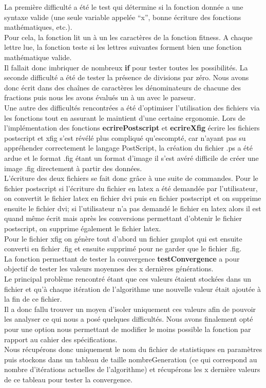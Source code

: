 \documentclass[a4paper,11pt]{article}
\begin{document}
			La première difficulté a été le test qui détermine si la fonction donnée a une syntaxe valide (une seule variable appelée “x”, bonne écriture des fonctions mathématiques, etc.).\\
			Pour cela, la fonction lit  un à un les caractères de la fonction fitness. A chaque lettre lue, la fonction teste si les lettres suivantes forment bien une fonction mathématique valide. \\
			Il fallait donc imbriquer de nombreux \textbf{if} pour tester toutes les possibilités. La seconde difficulté a été de tester la présence de divisions par zéro. Nous avons donc écrit dans des chaînes de caractères les dénominateurs de chacune des fractions puis nous les avons évalués un à un avec le parseur.\\

			Une autre des difficultés rencontrées a été d'optimiser l'utilisation des fichiers via les fonctions tout en assurant le maintient d'une certaine ergonomie.
			Lors de l'implémentation des fonctions \textbf{ecrirePostscript} et  \textbf{ecrireXfig} écrire les fichiers postscript et xfig s’est révélé plus compliqué qu’escompté, car n’ayant pas su appréhender correctement le langage PostScript, la création du fichier .ps a été ardue et le format .fig étant un format d’image il s’est avéré difficile de créer une image .fig directement à partir des données.\\
			L’écriture des deux fichiers se fait donc grâce à une suite de commandes. Pour le fichier postscript si l'écriture du fichier en latex a été demandée par l’utilisateur, on convertit le fichier latex en fichier dvi puis en fichier postscript et on supprime ensuite le fichier dvi; si l'utilisateur n’a pas demandé le fichier en latex alors il est quand même écrit mais après les conversions permettant d’obtenir le fichier postscript, on supprime également le fichier latex.\\
			Pour le fichier xfig on génère tout d’abord un fichier gnuplot qui est ensuite converti en fichier .fig et ensuite supprimé pour ne garder que le fichier .fig.\\

			La fonction permettant de tester la convergence \textbf{testConvergence} a pour objectif de tester les valeurs moyennes des x dernières générations.\\
			Le principal problème rencontré étant que ces valeurs étaient stockées dans un fichier et qu’à chaque itération de l’algorithme une nouvelle valeur était ajoutée à la fin de ce fichier.\\
			Il a donc fallu trouver un moyen d’isoler uniquement ces valeurs afin de pouvoir les analyser ce qui nous a posé quelques difficultés. Nous avons finalement opté pour une option nous permettant de modifier le moins possible la fonction par rapport au cahier des spécifications.\\
			Nous récupérons donc uniquement le nom du fichier de statistiques en paramètres puis stockons dans un tableau de taille nombreGeneration (ce qui correspond au nombre d’itérations actuelles de l’algorithme) et récupérons les x dernière valeurs de ce tableau pour tester la convergence.\\
\end{document}
